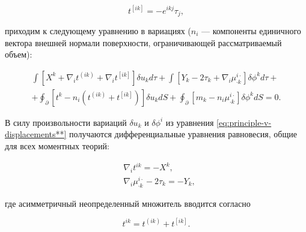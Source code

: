 \begin{equation}

t^{[ik]}=-e^{ikj}\tau_j,

\end{equation}

приходим к следующему уравнению в вариациях (\(n_i\) \cdash--- компоненты единичного вектора внешней нормали поверхности, ограничивающей рассматриваемый объем):

\begin{multline}

\int\left[{X^k+\nabla_it^{(ik)}+\nabla_it^{[ik]}}\right]\delta u_kd\tau +\int\left[{Y_k-2\tau_k+\nabla_i\mu^{i\cdot}_{\cdot k}}\right]\delta\phi^kd\tau+\\

+\oint _\partial\left[{t^k-n_i(t^{(ik)}+t^{[ik]})}\right]\delta u_kdS 

+\oint _\partial\left[{m_k-n_i\mu^{i\cdot}_{\cdot k}}\right]\delta\phi^kdS=0.

\label{eq:principle-v-displacements**}

\end{multline}



\smallskip





%

В силу произвольности вариаций \(\delta u_k\) и \(\delta\phi^i\) из уравнения \eqref{eq:principle-v-displacements**} получаются дифференциальные уравнения равновесия, общие для всех моментных теорий:

\begin{equation}

\begin{aligned}

&\nabla_it^{ik}=-X^k,\\

&\nabla_i\mu^{i\cdot}_{\cdot k}-2\tau_k=-Y_k,

\label{eq:static-eqs}

\end{aligned}

\end{equation}

где асимметричный неопределенный множитель вводится согласно

\begin{equation}

t^{ik}=t^{(ik)}+t^{[ik]}.

\end{equation}



